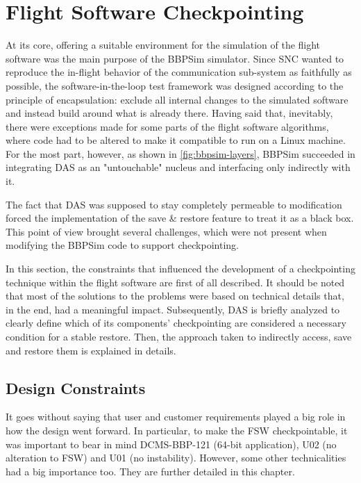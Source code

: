 {
\setlength{\parindent}{2em}
\chapter{Flight Software Checkpointing}\label{cha:das-impl}
At its core, offering a suitable environment for the simulation of the flight software was the main purpose of the BBPSim simulator. Since \gls{SNC} wanted to reproduce the in-flight behavior of the communication sub-system as faithfully as possible, the software-in-the-loop test framework was designed according to the principle of encapsulation: exclude all internal changes to the simulated software and instead build around what is already there. Having said that, inevitably, there were exceptions made for some parts of the flight software algorithms, where code had to be altered to make it compatible to run on a Linux machine. For the most part, however, as shown in \autoref{fig:bbpsim-layers}, BBPSim succeeded in integrating \gls{DAS} as an "untouchable" nucleus and interfacing only indirectly with it.

The fact that DAS was supposed to stay completely permeable to modification forced the implementation of the save \& restore feature to treat it as a black box. This point of view brought several challenges, which were not present when modifying the BBPSim code to support checkpointing. 

In this section, the constraints that influenced the development of a checkpointing technique within the flight software are first of all described. It should be noted that most of the solutions to the problems were based on technical details that, in the end, had a meaningful impact. Subsequently, \gls{DAS} is briefly analyzed to clearly define which of its components' checkpointing are considered a necessary condition for a stable restore. Then, the approach taken to indirectly access, save and restore them is explained in details.

\section{Design Constraints}
It goes without saying that user and customer requirements played a big role in how the design went forward. In particular, to make the \gls{FSW} checkpointable, it was important to bear in mind DCMS-BBP-121 (64-bit application), U02 (no alteration to FSW) and U01 (no instability). However, some other technicalities had a big importance too. They are further detailed in this chapter.

}
